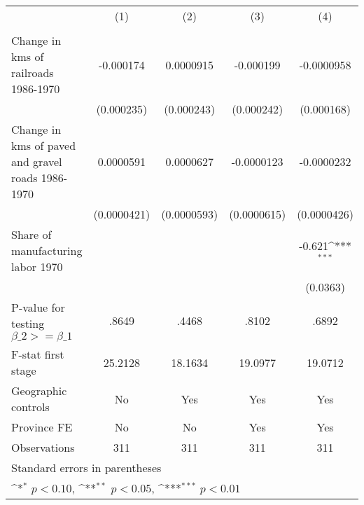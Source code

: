 {
\def\sym#1{\ifmmode^{#1}\else\(^{#1}\)\fi}
\begin{tabular}{l*{4}{c}}
\hline\hline
                &\multicolumn{1}{c}{(1)}&\multicolumn{1}{c}{(2)}&\multicolumn{1}{c}{(3)}&\multicolumn{1}{c}{(4)}\\
                &\multicolumn{1}{c}{}&\multicolumn{1}{c}{}&\multicolumn{1}{c}{}&\multicolumn{1}{c}{}\\
\hline
Change in kms of railroads 1986-1970&-0.000174         &0.0000915         &-0.000199         &-0.0000958         \\
                &(0.000235)         &(0.000243)         &(0.000242)         &(0.000168)         \\
[1em]
Change in kms of paved and gravel roads 1986-1970&0.0000591         &0.0000627         &-0.0000123         &-0.0000232         \\
                &(0.0000421)         &(0.0000593)         &(0.0000615)         &(0.0000426)         \\
[1em]
Share of manufacturing labor 1970&                  &                  &                  &   -0.621\sym{***}\\
                &                  &                  &                  & (0.0363)         \\
\hline
P-value for testing $\beta\_{2} >= \beta\_{1}$&    .8649         &    .4468         &    .8102         &    .6892         \\
F-stat first stage&  25.2128         &  18.1634         &  19.0977         &  19.0712         \\
Geographic controls&       No         &      Yes         &      Yes         &      Yes         \\
Province FE     &       No         &       No         &      Yes         &      Yes         \\
Observations    &      311         &      311         &      311         &      311         \\
\hline\hline
\multicolumn{5}{l}{\footnotesize Standard errors in parentheses}\\
\multicolumn{5}{l}{\footnotesize \sym{*} \(p<0.10\), \sym{**} \(p<0.05\), \sym{***} \(p<0.01\)}\\
\end{tabular}
}
